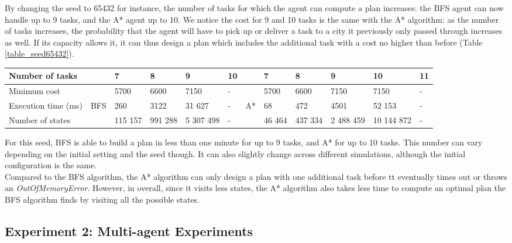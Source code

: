 \documentclass[10pt]{article}
\begin{document}
\noindent
By changing the seed to 65432 for instance, the number of tasks for which the agent can compute a plan increases: the BFS agent can now handle up to 9 tasks, and the A* agent up to 10. We notice the cost for 9 and 10 tasks is the same with the A* algorithm: as the number of tasks increases, the probability that the agent will have to pick up or deliver a task to a city it previously only passed through increases as well. If its capacity allows it, it can thus design a plan which includes the additional task with a cost no higher than before (Table \ref{table_seed65432}).\\
\begin{adjustwidth}{0cm}{}
\begin{tabular}{|l|lllll|llllll|}
\hline
Number of tasks & & 7 & 8 & 9 & 10 & & 7 & 8 & 9 & 10 & 11\\
\hline
Minimum cost & & 5700 & 6600 & 7150 & - & & 5700 & 6600 & 7150 & 7150 & -\\
Execution time (ms) & BFS & 260 & 3122 & 31 627 & - & A* & 68 & 472 & 4501 & 52 153 & -\\
Number of states & & 115 157 & 991 288 & 5 307 498 & - & & 46 464 & 437 334 & 2 488 459 & 10 144 872 & -\\
\hline
\end{tabular}
\label{table_seed65432}
\end{adjustwidth}
\vspace{4mm}

\noindent
For this seed, BFS is able to build a plan in less than one minute for up to 9 tasks, and A* for up to 10 tasks. This number can vary depending on the initial setting and the seed though. It can also slightly change across different simulations, although the initial configuration is the same.\\

\noindent
Compared to the BFS algorithm, the A* algorithm can only design a plan with one additional task before tt eventually times out or throws an \textit{OutOfMemoryError}.
However, in overall, since it visits less states, the A* algorithm also takes less time to compute an optimal plan the BFS algorithm finds by visiting all the possible states.

\subsection{Experiment 2: Multi-agent Experiments}
\end{document}
